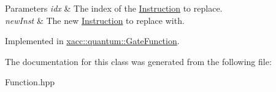 \begin{DoxyParams}{Parameters}
{\em idx} & The index of the \hyperlink{a00037}{Instruction} to replace. \\
\hline
{\em new\+Inst} & The new \hyperlink{a00037}{Instruction} to replace with. \\
\hline
\end{DoxyParams}


Implemented in \hyperlink{a00032_a182fdfabbf546ae89e4f2384bafb45c9}{xacc\+::quantum\+::\+Gate\+Function}.



The documentation for this class was generated from the following file\+:\begin{DoxyCompactItemize}
\item 
Function.\+hpp\end{DoxyCompactItemize}
